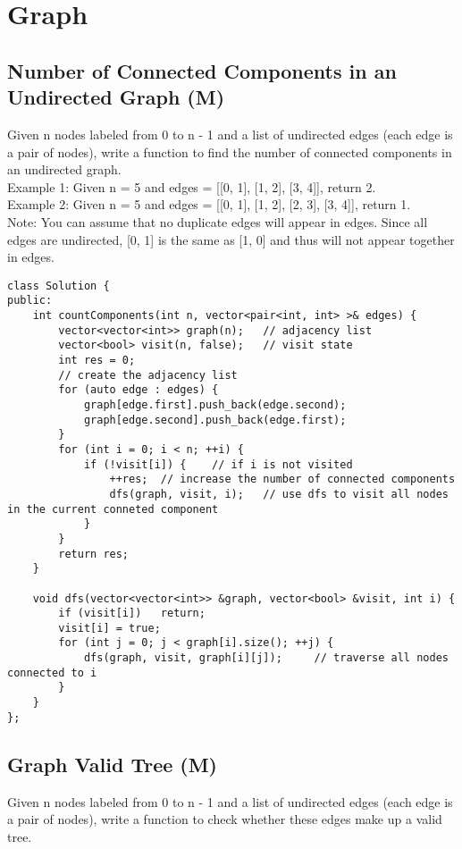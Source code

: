 \chapter{Graph}
\section{Number of Connected Components in an Undirected Graph (M)}
Given n nodes labeled from 0 to n - 1 and a list of undirected edges (each edge is a pair of nodes), write a function to find the number of connected components in an undirected graph.\\

Example 1: 
Given n = 5 and edges = [[0, 1], [1, 2], [3, 4]], return 2.\\

Example 2:
Given n = 5 and edges = [[0, 1], [1, 2], [2, 3], [3, 4]], return 1.\\

Note:
You can assume that no duplicate edges will appear in edges. Since all edges are undirected, [0, 1] is the same as [1, 0] and thus will not appear together in edges.\\

\begin{lstlisting}
class Solution {
public:
    int countComponents(int n, vector<pair<int, int> >& edges) {
        vector<vector<int>> graph(n);   // adjacency list
        vector<bool> visit(n, false);   // visit state
        int res = 0;
        // create the adjacency list
        for (auto edge : edges) {
            graph[edge.first].push_back(edge.second);
            graph[edge.second].push_back(edge.first);
        }
        for (int i = 0; i < n; ++i) {
            if (!visit[i]) {	// if i is not visited
                ++res;	// increase the number of connected components
                dfs(graph, visit, i);   // use dfs to visit all nodes in the current conneted component
            }
        }
        return res;
    }
    
    void dfs(vector<vector<int>> &graph, vector<bool> &visit, int i) {
        if (visit[i])   return;
        visit[i] = true;
        for (int j = 0; j < graph[i].size(); ++j) {
            dfs(graph, visit, graph[i][j]);     // traverse all nodes connected to i
        }
    }
};
\end{lstlisting}


\section{Graph Valid Tree (M)}
Given n nodes labeled from 0 to n - 1 and a list of undirected edges (each edge is a pair of nodes), write a function to check whether these edges make up a valid tree.\\

